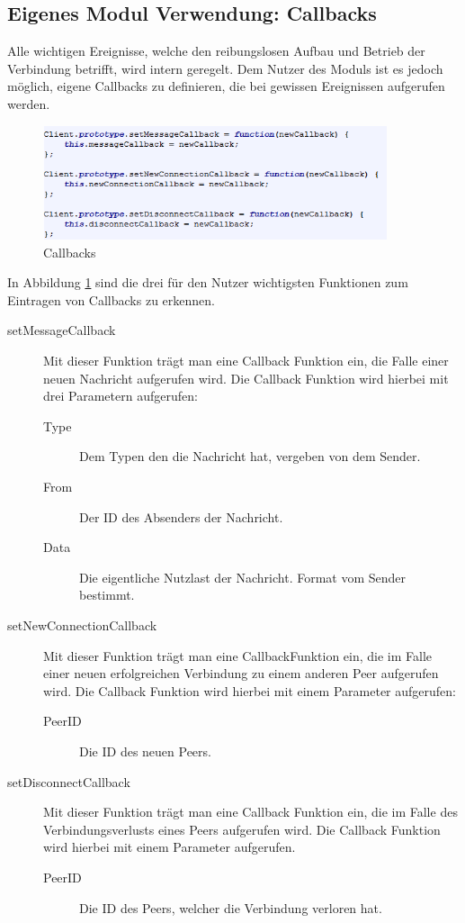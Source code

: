 \subsection{Eigenes Modul Verwendung: Callbacks}
Alle wichtigen Ereignisse, welche den reibungslosen Aufbau und Betrieb der Verbindung betrifft, wird intern geregelt. Dem Nutzer des Moduls ist es jedoch möglich, eigene Callbacks zu definieren, die bei gewissen Ereignissen aufgerufen werden.
\begin{figure}[ht]
\centering
\includegraphics[width=0.9\textwidth]{backend/Modul_Callbacks.PNG}
\caption{Callbacks}
\label{backfig9}
\end{figure}
In Abbildung \ref{backfig9} sind die drei für den Nutzer wichtigsten Funktionen zum Eintragen von Callbacks zu erkennen.

\begin{description}
\item[setMessageCallback]
Mit dieser Funktion trägt man eine Callback Funktion ein, die Falle einer neuen Nachricht aufgerufen wird. 
Die Callback Funktion wird hierbei mit drei Parametern aufgerufen:

  \begin{description}
  \item[Type]
  Dem Typen den die Nachricht hat, vergeben von dem Sender.
  
  \item[From]
  Der ID des Absenders der Nachricht.
  
  \item[Data]
  Die eigentliche Nutzlast der Nachricht. Format vom Sender bestimmt.
  \end{description}

\item[setNewConnectionCallback]
Mit dieser Funktion trägt man eine CallbackFunktion  ein, die im Falle einer neuen erfolgreichen Verbindung zu einem anderen Peer aufgerufen wird.
Die Callback Funktion wird hierbei mit einem Parameter aufgerufen:

  \begin{description}
  \item[PeerID]
  Die ID des neuen Peers.
  \end{description}
  
\item[setDisconnectCallback]
Mit dieser Funktion trägt man eine Callback Funktion ein, die im Falle des Verbindungsverlusts eines Peers aufgerufen wird.
Die Callback Funktion wird hierbei mit einem Parameter aufgerufen.

  \begin{description}
  \item[PeerID]
  Die ID des Peers, welcher die Verbindung verloren hat.
  \end{description}
\end{description}


